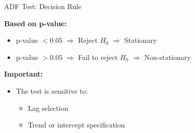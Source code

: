 \documentclass[aspectratio=169]{beamer}
\begin{document}
\begin{frame}{ADF Test: Decision Rule}

\textbf{Based on p-value:}

\begin{itemize}
    \item p-value $< 0.05$ $\Rightarrow$ Reject $H_0$ $\Rightarrow$ Stationary
    \item p-value $> 0.05$ $\Rightarrow$ Fail to reject $H_0$ $\Rightarrow$ Non-stationary
\end{itemize}

\vspace{0.4cm}

\textbf{Important:}
\begin{itemize}
    \item The test is sensitive to:
    \begin{itemize}
        \item Lag selection
        \item Trend or intercept specification
    \end{itemize}
\end{itemize}

\end{frame}
\end{document}
